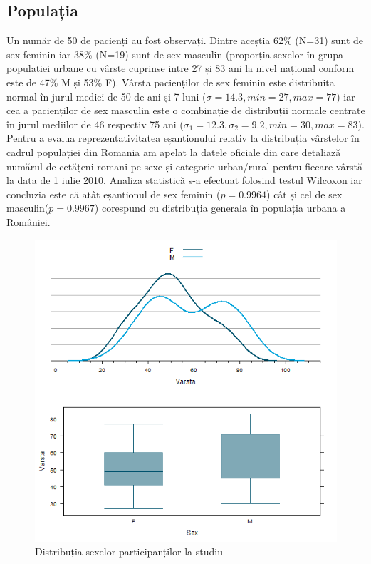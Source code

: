 \documentclass[11pt,draft]{article}
\begin{document}
\subsection{Populația}
  Un număr de 50 de pacienți au fost observați. Dintre aceștia 62\% (N=31) sunt de sex feminin iar 38\% (N=19) sunt de sex masculin (proporția sexelor în grupa populației urbane cu vârste cuprinse intre 27 și 83 ani la nivel național conform \citep{insee2011} este de 47\% M și 53\% F).
  Vârsta pacienților de sex feminin este distribuita normal în jurul mediei de 50 de ani și 7 luni ($\sigma=14.3,min=27,max=77$) iar cea a pacienților de sex masculin este o combinație de distribuții normale centrate în jurul mediilor de 46 respectiv 75 ani ($\sigma_{1}=12.3 , \sigma_{2}=9.2,min=30,max=83$).
  Pentru a evalua reprezentativitatea eșantionului relativ la distribuția vârstelor în cadrul populației din Romania am apelat la datele oficiale din \citep{insee2011} care detaliază numărul de cetățeni romani pe sexe și categorie urban/rural pentru fiecare vârstă la data de 1 iulie 2010. 
  Analiza statistică s-a efectuat folosind testul Wilcoxon iar concluzia este că atât eșantionul de sex feminin ($p=0.9964$) cât și cel de sex masculin($p=0.9967$) corespund cu distribuția generala în populația urbana a României.
  \begin{figure}[H]
   \centering
   \includegraphics[width=0.8\linewidth]{incoVarstaSex}
   \caption{Distribuția sexelor participanților la studiu}
   \label{fig:Distributia sexelor participantilor la studiu}
  \end{figure}
\end{document}

